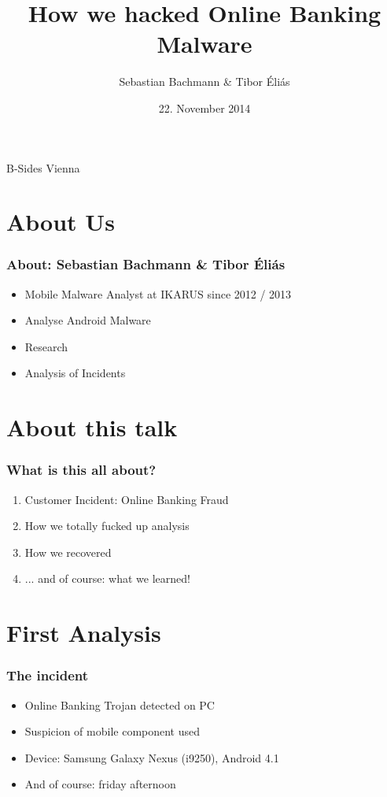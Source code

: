 \documentclass[12pt,a4paper]{beamer}
\author{Sebastian Bachmann \& Tibor Éliás}
\title{How we hacked Online Banking Malware}
\date{22. November 2014}
\begin{document}
\begin{frame}
    \maketitle
    \centering
    B-Sides Vienna
\end{frame}


\section{About Us}
\begin{frame}
	\frametitle{About: Sebastian Bachmann \& Tibor Éliás}
	\begin{itemize}
		\item Mobile Malware Analyst at IKARUS since 2012 / 2013
		\item Analyse Android Malware
		\item Research
		\item Analysis of Incidents
	\end{itemize}
\end{frame}

\section{About this talk}
\begin{frame}
	\frametitle{What is this all about?}
	\begin{enumerate}
	
		\item Customer Incident: Online Banking Fraud
		\item How we totally fucked up analysis
		\item How we recovered
		\item ... and of course: what we learned!
	\end{enumerate}
\end{frame}


\section{First Analysis}

\begin{frame}
	\frametitle{The incident}
	
	\begin{itemize}
		\item Online Banking Trojan detected on PC
		\item Suspicion of mobile component used
		\item Device: Samsung Galaxy Nexus (i9250), Android 4.1
		\item And of course: friday afternoon
	\end{itemize}

\end{frame}
\end{document}
